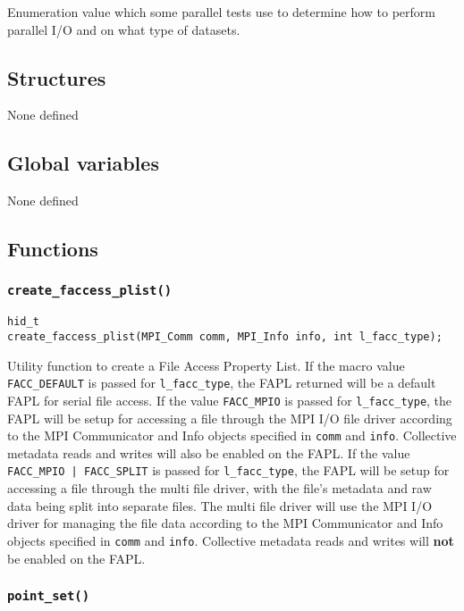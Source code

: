 \documentclass[../HDF5_RFC.tex]{subfiles}
\begin{document}
Enumeration value which some parallel tests use to determine how to perform parallel I/O
and on what type of datasets.

\subsection{Structures}

None defined

\subsection{Global variables}

None defined

\subsection{Functions}

\subsubsection{\texttt{create\_faccess\_plist()}}

\begin{verbatim}
hid_t
create_faccess_plist(MPI_Comm comm, MPI_Info info, int l_facc_type);
\end{verbatim}

Utility function to create a File Access Property List. If the macro value \texttt{FACC\_DEFAULT} is
passed for \texttt{l\_facc\_type}, the FAPL returned will be a default FAPL for serial file access. If
the value \texttt{FACC\_MPIO} is passed for \texttt{l\_facc\_type}, the FAPL will be setup for accessing
a file through the MPI I/O file driver according to the MPI Communicator and Info objects specified in \texttt{comm} and \texttt{info}. Collective metadata reads and writes will also be enabled on the FAPL.
If the value \texttt{FACC\_MPIO | FACC\_SPLIT} is passed for \texttt{l\_facc\_type}, the FAPL will be
setup for accessing a file through the multi file driver, with the file's metadata and raw data being
split into separate files. The multi file driver will use the MPI I/O driver for managing the file data
according to the MPI Communicator and Info objects specified in \texttt{comm} and \texttt{info}.
Collective metadata reads and writes will \textbf{not} be enabled on the FAPL.

\subsubsection{\texttt{point\_set()}}
\end{document}
